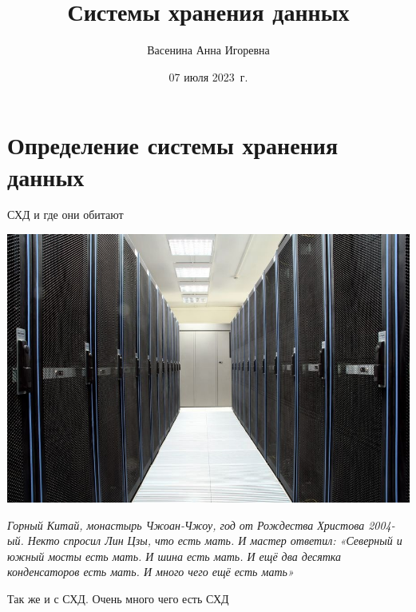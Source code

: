 \documentclass[aspectratio=169]{beamer}
\title[7 июля 2023~г.]{Системы хранения данных}
\author[Васенина А.И.]{Васенина Анна Игоревна}
\date[]{07 июля 2023~г.}
\begin{document}
\begin{frame}
  \titlepage
\end{frame}

\section{Определение системы хранения данных}

\begin{frame}{СХД и где они обитают}

    \begin{minipage}{0.7\linewidth}
    \includegraphics[scale=0.3]{fig/1.servers.jpg}
    \end{minipage}
    \begin{minipage}{0.25\linewidth}
    \vspace{-8em}
    \tiny{\textit{Горный Китай, монастырь Чжоан-Чжоу, год от Рождества Христова 2004-ый. Некто спросил Лин Цзы, что есть мать. И мастер ответил: «Северный и южный мосты есть мать. И шина есть мать. И ещё два десятка конденсаторов есть мать. И много чего ещё есть мать»}}

    \pause
    \vspace{4em}
    \normalsize Так же и с СХД. Очень много чего есть СХД
    \end{minipage}
\end{frame}
\end{document}
